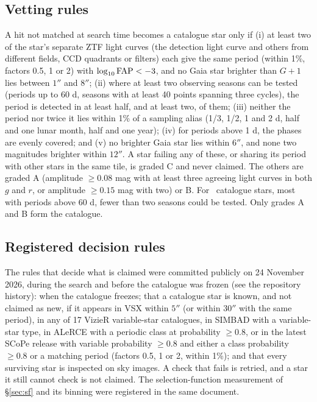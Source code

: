 \documentclass[twocolumn]{searchchev_preprint}
\begin{document}
\subsection{Vetting rules}\label{sec:vet}
A hit not matched at search time becomes a catalogue star only if (i) at least two of the star's separate ZTF light
curves (the detection light curve and others from different fields, CCD quadrants or filters) each give the same period
(within 1\%, factors 0.5, 1 or 2) with $\log_{10}{\rm FAP}<-3$, and no Gaia star brighter than $G+1$ lies between $1''$
and $8''$; (ii) where at least two observing seasons can be tested (periods up to 60 d, seasons with at least 40 points
spanning three cycles), the period is detected in at least half, and at least two, of them; (iii) neither the period nor twice it lies within 1\% of a sampling alias (1/3, 1/2, 1 and 2 d, half and one
lunar month, half and one year); (iv) for periods above 1 d, the phases are evenly covered; and (v) no brighter Gaia
star lies within $6''$, and none two magnitudes brighter within $12''$. A star failing any of these, or sharing its
period with other stars in the same tile, is graded C and never claimed. The others are graded A (amplitude
$\ge0.08$ mag with at least three agreeing light curves in both $g$ and $r$, or amplitude $\ge0.15$ mag with two) or B.
For \nnseasonuntested\ catalogue stars, most with periods above 60 d, fewer than two seasons could be tested. Only
grades A and B form the catalogue.

\subsection{Registered decision rules}
The rules that decide what is claimed were committed publicly on 24 November 2026, during the search and before the
catalogue was frozen
(see the repository history): when the catalogue freezes; that a catalogue star is known, and not claimed as new, if
it appears in VSX within $5''$ (or within $30''$ with the same period), in any of 17 VizieR variable-star catalogues,
in SIMBAD with a variable-star type, in ALeRCE \citep{SanchezSaez2021} with a periodic class at probability $\ge0.8$,
or in the latest SCoPe release \citep{Healy2024} with variable probability $\ge0.8$ and either a class probability
$\ge0.8$ or a matching period (factors 0.5, 1 or 2, within 1\%); and that every surviving star is inspected on sky
images. A check that fails is retried, and a star it still cannot check is not claimed. The selection-function
measurement of \S\ref{sec:sf} and its binning were registered in the same document.
\end{document}
